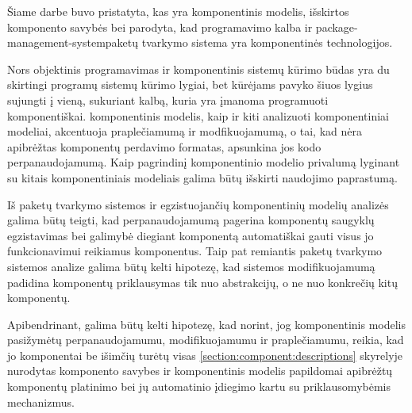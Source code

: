 

Šiame darbe buvo pristatyta, kas yra komponentinis modelis, išskirtos
komponento savybės bei parodyta, kad  programavimo
kalba ir  \gls{package-management-system}{paketų
tvarkymo sistema} yra komponentinės technologijos.

Nors objektinis programavimas ir komponentinis sistemų kūrimo būdas
yra du skirtingi programų sistemų kūrimo lygiai, bet
 kūrėjams pavyko šiuos lygius sujungti į vieną,
sukuriant kalbą, kuria yra įmanoma programuoti komponentiškai.
 komponentinis modelis, kaip ir kiti
\cite{classification-framework-for-scm} analizuoti komponentiniai
modeliai, akcentuoja praplečiamumą ir modfikuojamumą, o tai, kad
nėra apibrėžtas  komponentų perdavimo formatas,
apsunkina jos kodo perpanaudojamumą. Kaip pagrindinį 
komponentinio modelio privalumą lyginant su kitais komponentiniais
modeliais galima būtų išskirti  naudojimo paprastumą.

Iš  paketų tvarkymo sistemos ir egzistuojančių
komponentinių modelių analizės galima būtų teigti, kad
perpanaudojamumą pagerina komponentų saugyklų egzistavimas bei galimybė
diegiant komponentą automatiškai gauti visus jo funkcionavimui
reikiamus komponentus. Taip pat remiantis  paketų
tvarkymo sistemos analize galima būtų kelti hipotezę, kad
sistemos modifikuojamumą padidina komponentų priklausymas tik nuo
abstrakcijų, o ne nuo konkrečių kitų komponentų.

Apibendrinant, galima būtų kelti hipotezę, kad norint, jog
komponentinis modelis pasižymėtų perpanaudojamumu, modifikuojamumu ir
praplečiamumu, reikia, kad jo komponentai be išimčių turėtų visas
\ref{section:component:descriptions} skyrelyje nurodytas komponento
savybes ir komponentinis modelis papildomai apibrėžtų komponentų
platinimo bei jų automatinio įdiegimo kartu su priklausomybėmis
mechanizmus.
